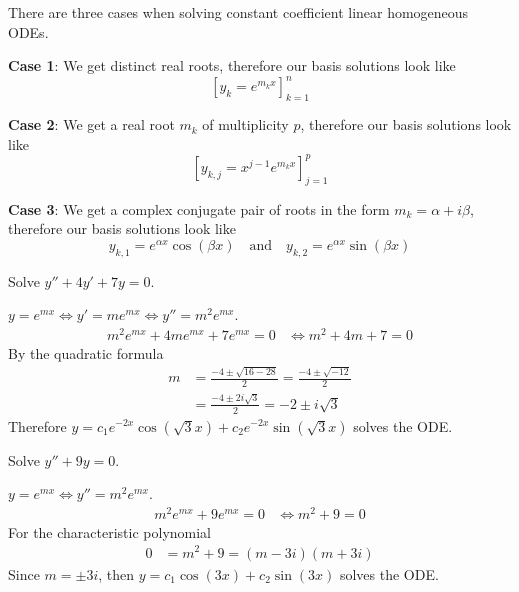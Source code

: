 \documentclass[notes]{subfiles}
\begin{document}
There are three cases when solving constant coefficient linear homogeneous ODEs.

\textbf{Case 1}: We get distinct real roots, therefore our basis solutions look like
\[
    [y_k = e^{m_k x}]_{k = 1}^n
\]

\textbf{Case 2}: We get a real root $m_k$ of multiplicity $p$, therefore our basis solutions look like
\[
    [y_{k, j} = x^{j - 1}e^{m_k x}]_{j = 1}^p
\]

\textbf{Case 3}: We get a complex conjugate pair of roots in the form $m_k = \alpha + i\beta$, therefore our basis solutions look like
\[
    y_{k, 1} = e^{\alpha x}\cos(\beta x) \quad \text{and} \quad y_{k, 2} = e^{\alpha x}\sin(\beta x)
\]

\begin{exercise}
    Solve $y'' + 4y' + 7y = 0$.
\end{exercise}
\begin{solution}
    $y = e^{mx} \iff y' = me^{mx} \iff y'' = m^2e^{mx}$.
    \begin{align*}
        m^2e^{mx} + 4me^{mx} + 7e^{mx} = 0
        &\iff m^2 + 4m + 7 = 0
    \end{align*}
    By the quadratic formula
    \begin{align*}
        m
        &= \frac{-4 \pm \sqrt{16 - 28}}{2}
        = \frac{-4 \pm \sqrt{-12}}{2} \\
        &= \frac{-4 \pm 2i\sqrt{3}}{2}
        = -2 \pm i\sqrt{3}
    \end{align*}
    Therefore $y = c_1 e^{-2x}\cos(\sqrt{3}x) + c_2 e^{-2x}\sin(\sqrt{3}x)$ solves the ODE.
\end{solution}

\begin{exercise}
    Solve $y'' + 9y = 0$.
\end{exercise}
\begin{solution}
    $y = e^{mx} \iff y'' = m^2e^{mx}$.
    \begin{align*}
        m^2e^{mx} + 9e^{mx} = 0
        &\iff m^2 + 9 = 0
    \end{align*}
    For the characteristic polynomial
    \begin{align*}
        0
        &= m^2 + 9
        = (m - 3i)(m + 3i)
    \end{align*}
    Since $m = \pm 3i$, then $y = c_1 \cos(3x) + c_2 \sin(3x)$ solves the ODE.
\end{solution}
\end{document}
